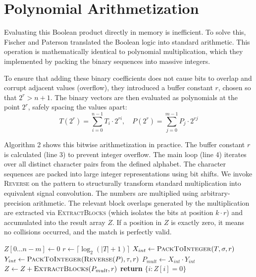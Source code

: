 \section{Polynomial Arithmetization}
Evaluating this Boolean product directly in memory is inefficient. To solve this, Fischer and Paterson translated the Boolean logic into standard arithmetic. This operation is mathematically identical to polynomial multiplication, which they implemented by packing the binary sequences into massive integers.

To ensure that adding these binary coefficients does not cause bits to overlap and corrupt adjacent values (overflow), they introduced a buffer constant $r$, chosen so that $2^r > n+1$. The binary vectors are then evaluated as polynomials at the point $2^r$, safely spacing the values apart:
\begin{equation}
    T(2^r) = \sum_{i=0}^{n-1} T_i \cdot 2^{ri}, \quad P(2^r) = \sum_{j=0}^{m-1} P_j \cdot 2^{rj}
\end{equation}

Algorithm 2 shows this bitwise arithmetization in practice. The buffer constant $r$ is calculated (line 3) to prevent integer overflow. The main loop (line 4) iterates over all distinct character pairs from the defined alphabet. The character sequences are packed into large integer representations using bit shifts. We invoke \textsc{Reverse} on the pattern to structurally transform standard multiplication into equivalent signal convolution. The numbers are multiplied using arbitrary-precision arithmetic. The relevant block overlaps generated by the multiplication are extracted via \textsc{ExtractBlocks} (which isolates the bits at position $k \cdot r$) and accumulated into the result array $Z$. If a position in $Z$ is exactly zero, it means no collisions occurred, and the match is perfectly valid.

\begin{algorithm}[H]
\caption{Fischer-Paterson Bitwise Multiplication}
\begin{algorithmic}[1]
    \State $Z[0 \dots n-m] \gets 0$
    \State $r \gets \lceil \log_2(|T| + 1) \rceil$ 
        \State $X_{int} \gets \text{\textsc{PackToInteger}}(T, \sigma, r)$
        \State $Y_{int} \gets \text{\textsc{PackToInteger}}(\text{\textsc{Reverse}}(P), \tau, r)$
        \State $P_{mult} \gets X_{int} \cdot Y_{int}$ 
        \State $Z \gets Z + \text{\textsc{ExtractBlocks}}(P_{mult}, r)$
    \EndFor
    \State \textbf{return} $\{i \colon Z[i] = 0\}$
\EndFunction
\end{algorithmic}
\end{algorithm}

